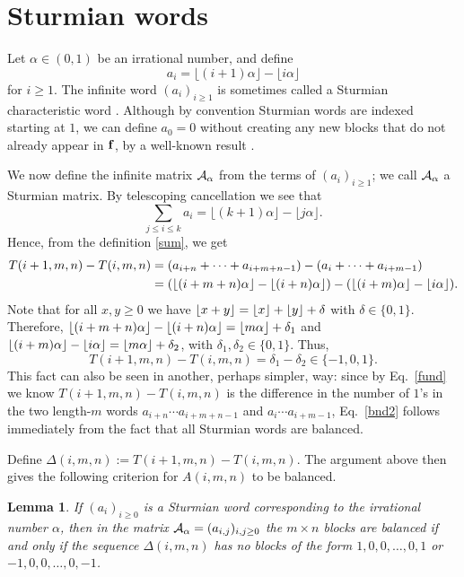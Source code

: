 \documentclass[final]{dmtcs-episciences}
\theoremstyle{plain}
\newtheorem{lemma}[theorem]{Lemma}
\theoremstyle{remark}
\DeclarePairedDelimiter\floor{\lfloor}{\rfloor}
\begin{document}
\section{Sturmian words}
Let $\alpha \in (0,1)$ be an irrational number, and define
$$a_i = \lfloor (i+1) \alpha \rfloor - \lfloor i \alpha \rfloor$$
for $i \geq 1$.  The infinite word
$(a_i)_{i \geq 1}$ is sometimes called a Sturmian characteristic word \citep{BrownT:1993,Berstel&Seebold:2002}.  Although by convention Sturmian words are indexed starting at $1$, we can define $a_0 = 0$ without creating any new blocks that do not already appear in $\bf f$,
by a well-known result \cite[Prop.~2.1.18]{Berstel&Seebold:2002}.

We now define the infinite matrix ${\cal A}_{\alpha}$ from the terms of $(a_i)_{i \geq 1}$; we call ${\cal A}_{\alpha}$ a Sturmian matrix.
By telescoping cancellation we see that
$$\sum_{j \leq i \leq k} a_i =
\lfloor (k+1) \alpha \rfloor -
\lfloor j \alpha \rfloor .$$
Hence, from the definition
\eqref{sum}, we get
\begin{align}
    T(i+1,m,n) - T(i,m,n) 
    &= (a_{i+n} + \dots + a_{i+m+n-1})
        - (a_{i} + \dots + a_{i+m-1})\nonumber\\
    &= (\floor{(i+m+n)\alpha} - \floor{(i+n)\alpha})
        - (\floor{(i+m)\alpha} - \floor{i \alpha}).
        \label{fund}
\end{align}
Note that for all $x,y\geq 0$ we have $\floor{x+y} = \floor{x} + \floor{y} + \delta$ with $\delta \in \{0,1\}$.
Therefore,
$\floor{(i+m+n)\alpha} - \floor{(i+n)\alpha} = \floor{m \alpha} + \delta_1$
and $\floor{(i+m)\alpha} - \floor{i \alpha} = \floor{m \alpha} + \delta_2$, with $\delta_1, \delta_2 \in \{0,1\}$.
Thus,
\begin{equation}
    T(i+1,m,n) - T(i,m,n)
    = \delta_1 - \delta_2
    \in \{-1,0,1\}.
\label{bnd2}
\end{equation}
This fact can also be seen in another, perhaps simpler, way: since by Eq.~\eqref{fund} we know $T(i+1,m,n) - T(i,m,n)$ is the difference in the number of $1$'s in the two length-$m$ words
$a_{i+n} \cdots a_{i+m+n-1}$ and
$a_i \cdots a_{i+m-1}$, Eq.~\eqref{bnd2} follows immediately from the fact that all Sturmian words are balanced.


Define $\Delta(i,m,n) := T(i+1,m,n)-T(i,m,n)$.
The argument above then gives the following criterion for $A(i,m,n)$ to be balanced.
\begin{lemma}
If $(a_i)_{i \geq 0}$ is a Sturmian word corresponding to the irrational number $\alpha$, then in the matrix 
${\cal A}_\alpha = (a_{i,j})_{i,j\geq 0}$
the $m \times n$ blocks are balanced
if and only if the sequence
$\Delta(i,m,n)$
has no blocks of the form
$1,0,0,\ldots, 0,1$ or
$-1,0,0,\ldots,0, -1$.
\label{lemma1}
\end{lemma}
\end{document}
